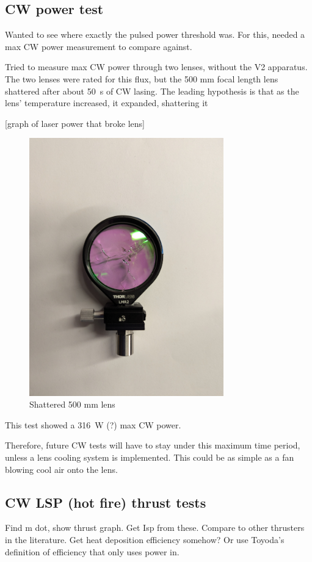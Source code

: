         \subsection{CW power test}

            Wanted to see where exactly the pulsed power threshold was. For this, needed a max CW power measurement to compare against. 

            Tried to measure max CW power through two lenses, without the V2 apparatus. The two lenses were rated for this flux, but the 500 mm focal length lens shattered after about \qty{50}{s} of CW lasing. The leading hypothesis is that as the lens' temperature increased, it expanded, shattering it

            [graph of laser power that broke lens]

            \begin{figure}
                \centering
                \includegraphics[width=0.75\textwidth]{assets/5 results/Shattered 500 mm lens.jpg}
                \caption{Shattered 500 mm lens}
            \end{figure}

            This test showed a \qty{316}{W} (?) max CW power.

            Therefore, future CW tests will have to stay under this maximum time period, unless a lens cooling system is implemented. This could be as simple as a fan blowing cool air onto the lens.


        \subsection{CW LSP (hot fire) thrust tests}

            Find m dot, show thrust graph. Get Isp from these. Compare to other thrusters in the literature. Get heat deposition efficiency somehow? Or use Toyoda's definition of efficiency that only uses power in.
 

            

        



